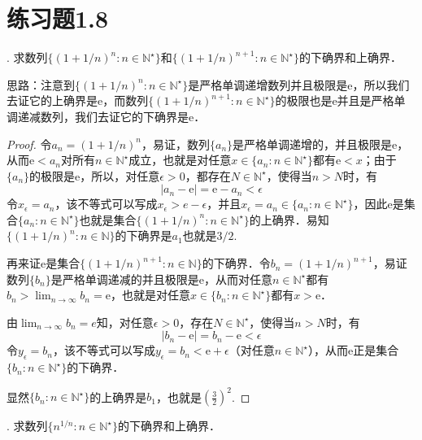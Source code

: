 \section*{练习题1.8}
. 求数列$\{ (1+1/n)^n : n \in \mathbb{N}^\star \}$和$\{(1+1/n)^{n+1}:n\in\mathbb{N}^\star\}$的下确界和上确界．

\noindent 思路：注意到$\{ (1+1/n)^n : n \in \mathbb{N}^\star \}$是严格单调递增数列并且极限是$\mathrm{e}$，所以我们去证它的上确界是$\mathrm{e}$，而数列$\{(1+1/n)^{n+1}:n\in\mathbb{N}^\star\}$的极限也是$\mathrm{e}$并且是严格单调递减数列，我们去证它的下确界是$\mathrm{e}$．
\begin{proof}
令$a_n = (1+1/n)^n$，易证，数列$\{ a_n \}$是严格单调递增的，并且极限是$\mathrm{e}$，从而$\mathrm{e} < a_n$对所有$n \in \mathbb{N}^\star$成立，也就是对任意$x \in \{a_n:n\in\mathbb{N}^\star\}$都有$\mathrm{e}<x$；由于$\{a_n\}$的极限是$\mathrm{e}$，所以，对任意$\epsilon >0$，都存在$N \in \mathbb{N}^\star$，使得当$n>N$时，有
\begin{equation}
    |a_n - \mathrm{e}| = \mathrm{e}-a_n < \epsilon
\end{equation}
令$x_\epsilon = a_n$，该不等式可以写成$x_\epsilon > e - \epsilon$，并且$x_\epsilon = a_n \in \{a_n : n \in \mathbb{N}^\star \}$，因此$\mathrm{e}$是集合$\{ a_n : n \in \mathbb{N}^\star \}$也就是集合$\{ (1+1/n)^n : n \in \mathbb{N}^\star \}$的上确界．易知$\{(1+1/n)^n:n\in\mathbb{N}\}$的下确界是$a_1$也就是$3/2$.

\noindent 再来证$\mathrm{e}$是集合$\{(1+1/n)^{n+1}:n\in\mathbb{N}\}$的下确界．令$b_n=(1+1/n)^{n+1}$，易证数列$\{b_n\}$是严格单调递减的并且极限是$\mathrm{e}$，从而对任意$n \in \mathbb{N}^\star$都有$b_n > \displaystyle\lim_{n\to\infty} b_n = \mathrm{e}$，也就是对任意$ x \in \{ b_n : n \in \mathbb{N}^\star \}$都有$x > \mathrm{e}$．

\noindent 由$\displaystyle\lim_{n\to\infty}b_n = e$知，对任意$\epsilon > 0$，存在$N \in \mathbb{N}^\star$，使得当$n > N$时，有
\begin{equation}
    |b_n - \mathrm{e}| = b_n - \mathrm{e} < \epsilon 
\end{equation}
令$y_\epsilon = b_n$，该不等式可以写成$y_\epsilon = b_n < \mathrm{e} + \epsilon$（对任意$n\in\mathbb{N}^\star$），从而$\mathrm{e}$正是集合$\{b_n:n\in\mathbb{N}^\star\}$的下确界．

\noindent 显然$\{b_n:n\in\mathbb{N}^\star\}$的上确界是$b_1$，也就是$\displaystyle \left(\frac{3}{2}\right)^2$.
\end{proof}

. 求数列$\{n^{1/n}:n\in\mathbb{N}^\star\}$的下确界和上确界．

